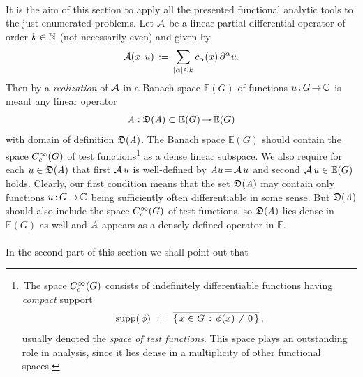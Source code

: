\documentclass[11pt,twoside]{article}
\def\G{G}
\begin{document}
\paragraph{} %
It is the aim of this section to apply
all the presented functional analytic tools to the just enumerated problems.
Let ${\mathcal{A}}$ be a linear partial differential operator of order $k \in {\mathbb{N}}$
(not necessarily even) and given by
\begin{equation}\label{ANY_ORDER_LPDO}
\A(x,u) \eqdef
\sum_{\abs{\alpha} \leq k} c_{\alpha}(x) \, \PA u.
\end{equation}
Then by a \textit{realization} of ${\mathcal{A}}$ in a Banach space $\mathbb{E}(\G)$
of functions $u \: \G \xto \C$ is meant any linear operator
\[
\mathit{A}: \mathfrak{D}(\mathit{A}) \subset \mathbb{E}(G) {\,\to\,} \mathbb{E}(G)
\]
with domain of definition $\mathfrak{D}(\mathit{A})$.
The Banach space $\mathbb{E}(\G)$ should contain the space $\TF$ 
of test functions\footnote{
\,The space $\TF$ consists of indefinitely differentiable functions
having \textit{compact} support
\[
\supp{\,\phi} \, \eqdef \, \overline{\set{x \in \G}{\phi(x) \neq 0}}\,,
\]
usually denoted the \textit{space of test functions}.
This space plays an out\-standing role in analysis,
since it lies dense in a multiplicity of other functional spaces.}
as a dense linear subspace.
We also require for each $u \in \mathfrak{D}(\mathit{A})$ that
first ${\mathcal{A}} \, u$ is well-defined by
$\mathit{A} u {\,=\,} {\mathcal{A}} \, u$ and second
$\A \, u \in \mathbb{E}(\G)$ holds.
Clearly,
our first condition means that the set $\mathfrak{D}(\mathit{A})$
may contain only functions $u \: \G \xto \C$ being sufficiently often
differentiable in some sense.
But $\mathfrak{D}(\mathit{A})$ should also include the space $\TF$ of test functions,
so $\mathfrak{D}(\mathit{A})$ lies dense in $\mathbb{E}(\G)$ as well 
and $\mathit{A}$ appears as a densely defined operator in $\mathbb{E}$.

\paragraph{} %
In the second part of this section we shall point out that
\end{document}
